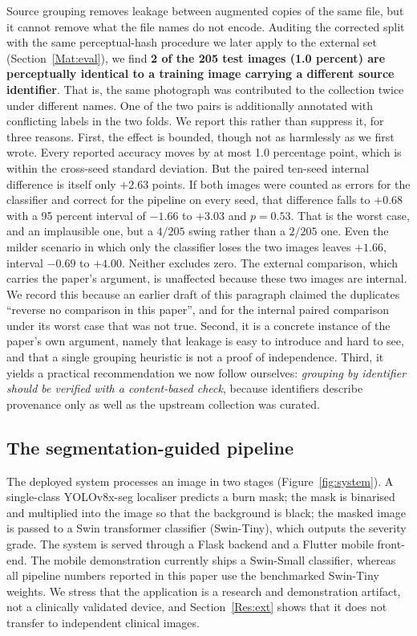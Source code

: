 \documentclass{melba}
\begin{document}
Source grouping removes leakage between augmented copies of the same file, but it cannot remove what the file names do not encode. Auditing the corrected split with the same perceptual-hash procedure we later apply to the external set (Section~\ref{Mat:eval}), we find \textbf{2 of the 205 test images (1.0 percent) are perceptually identical to a training image carrying a different source identifier}. That is, the same photograph was contributed to the collection twice under different names. One of the two pairs is additionally annotated with conflicting labels in the two folds. We report this rather than suppress it, for three reasons. First, the effect is bounded, though not as harmlessly as we first wrote. Every reported accuracy moves by at most 1.0 percentage point, which is within the cross-seed standard deviation. But the paired ten-seed internal difference is itself only $+2.63$ points. If both images were counted as errors for the classifier and correct for the pipeline on every seed, that difference falls to $+0.68$ with a 95 percent interval of $-1.66$ to $+3.03$ and $p=0.53$. That is the worst case, and an implausible one, but a $4/205$ swing rather than a $2/205$ one. Even the milder scenario in which only the classifier loses the two images leaves $+1.66$, interval $-0.69$ to $+4.00$. Neither excludes zero. The external comparison, which carries the paper's argument, is unaffected because these two images are internal. We record this because an earlier draft of this paragraph claimed the duplicates ``reverse no comparison in this paper'', and for the internal paired comparison under its worst case that was not true. Second, it is a concrete instance of the paper's own argument, namely that leakage is easy to introduce and hard to see, and that a single grouping heuristic is not a proof of independence. Third, it yields a practical recommendation we now follow ourselves: \emph{grouping by identifier should be verified with a content-based check}, because identifiers describe provenance only as well as the upstream collection was curated.

\subsection{The segmentation-guided pipeline}
\label{Mat:system}
The deployed system processes an image in two stages (Figure~\ref{fig:system}). A single-class YOLOv8x-seg localiser predicts a burn mask; the mask is binarised and multiplied into the image so that the background is black; the masked image is passed to a Swin transformer classifier (Swin-Tiny), which outputs the severity grade. The system is served through a Flask backend and a Flutter mobile front-end. The mobile demonstration currently ships a Swin-Small classifier, whereas all pipeline numbers reported in this paper use the benchmarked Swin-Tiny weights. We stress that the application is a research and demonstration artifact, not a clinically validated device, and Section~\ref{Res:ext} shows that it does not transfer to independent clinical images.
\end{document}
